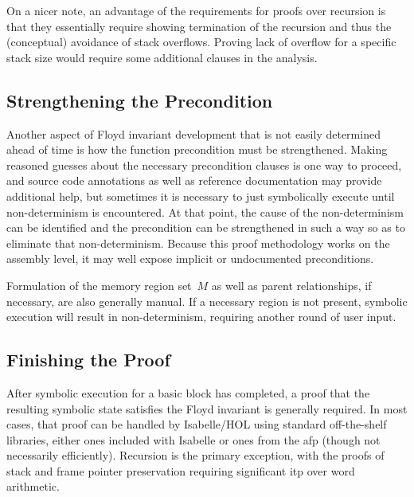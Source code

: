 On a nicer note, an advantage of the requirements for proofs over recursion
is that they essentially require showing termination of the recursion
and thus the (conceptual) avoidance of stack overflows.
Proving lack of overflow for a specific stack size
would require some additional clauses in the analysis.

\subsection{Strengthening the Precondition}
Another aspect of Floyd invariant development
that is not easily determined ahead of time is how the function precondition
must be strengthened.%
Making reasoned guesses about the necessary precondition clauses is one way to proceed,
and source code annotations as well as reference documentation
may provide additional help, but sometimes it is necessary to just symbolically execute
until non-determinism is encountered.
At that point, the cause of the non-determinism can be identified
and the precondition can be strengthened in such a way so as to eliminate%
that non-determinism.
Because this proof methodology works on the assembly level,
it may well expose implicit or undocumented preconditions.

Formulation of the memory region set~$M$ as well as parent relationships,
if necessary, are also generally manual.
If a necessary region is not present,
symbolic execution will result in non-determinism,
requiring another round of user input.

\subsection{Finishing the Proof}
After symbolic execution for a basic block has completed,
a proof that the resulting symbolic state satisfies the Floyd invariant
is generally required.
In most cases, that proof can be handled by Isabelle/HOL
using standard off-the-shelf libraries,
either ones included with Isabelle or ones from the \ac{afp} \autocite{afp}
(though not necessarily efficiently).
Recursion is the primary exception,
with the proofs of stack and frame pointer preservation
requiring significant \ac{itp} over word arithmetic.

